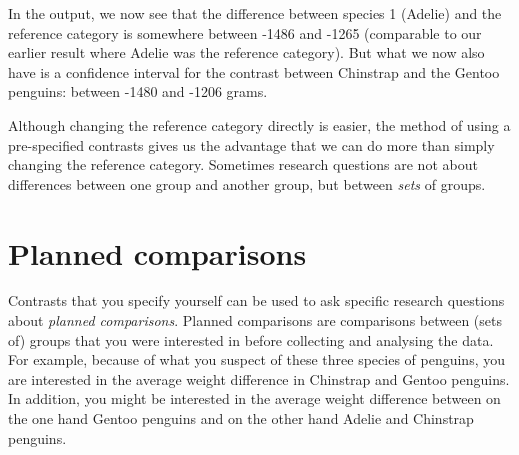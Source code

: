 \begin{knitrout}
\color{fgcolor}
\end{knitrout}

In the output, we now see that the difference between species 1 (Adelie) and the reference category is somewhere between -1486 and -1265 (comparable to our earlier result where Adelie was the reference category). But what we now also have is a confidence interval for the contrast between Chinstrap and the Gentoo penguins: between -1480 and -1206 grams.

Although changing the reference category directly is easier, the method of using a pre-specified contrasts gives us the advantage that we can do more than simply changing the reference category. Sometimes research questions are not about differences between one group and another group, but between \textit{sets} of groups.



\section{Planned comparisons}


Contrasts that you specify yourself can be used to ask specific research questions about \textit{planned comparisons}. Planned comparisons are comparisons between (sets of) groups that you were interested in before collecting and analysing the data. For example, because of what you suspect of these three species of penguins, you are interested in the average weight difference in Chinstrap and Gentoo penguins. In addition, you might be interested in the average weight difference between on the one hand Gentoo penguins and on the other hand Adelie and Chinstrap penguins. 

